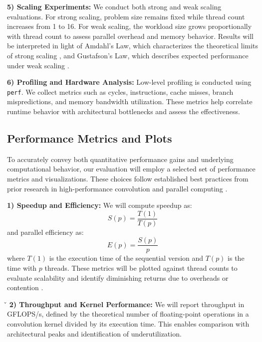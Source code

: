 \documentclass[conference, 10pt]{IEEEtran}
\begin{document}
\vspace{0.5em}
\textbf{5) Scaling Experiments:} 
We conduct both strong and weak scaling evaluations. For strong scaling, problem size remains fixed while thread count increases from 1 to 16. For weak scaling, the workload size grows proportionally with thread count to assess parallel overhead and memory behavior. Results will be interpreted in light of Amdahl’s Law, which characterizes the theoretical limits of strong scaling \cite{hager2021hpc}, and Gustafson’s Law, which describes expected performance under weak scaling \cite{Gustafson1988}.


\vspace{0.5em}
\textbf{6) Profiling and Hardware Analysis:} Low-level profiling is conducted using \texttt{perf}. We collect metrics such as cycles, instructions, cache misses, branch mispredictions, and memory bandwidth utilization. These metrics help correlate runtime behavior with architectural bottlenecks and assess the effectiveness.


\subsection{\textbf{Performance Metrics and Plots}}

To accurately convey both quantitative performance gains and underlying computational behavior, our evaluation will employ a selected set of performance metrics and visualizations. These choices follow established best practices from prior research in high-performance convolution and parallel computing \cite{Wang2023,  hager2021hpc, Rajput2013, Yoon2012}.

\vspace{0.5em}
\textbf{1) Speedup and Efficiency:} 
We will compute speedup as:
\begin{equation}
    S(p) = \frac{T(1)}{T(p)}
\end{equation}
and parallel efficiency as:
\begin{equation}
    E(p) = \frac{S(p)}{p}
\end{equation}
where \(T(1)\) is the execution time of the sequential version and \(T(p)\) is the time with \(p\) threads. These metrics will be plotted against thread counts to evaluate scalability and identify diminishing returns due to overheads or contention \cite{Rajput2013}.

\v\vspace{0.5em}
\textbf{2) Throughput and Kernel Performance:} 
We will report throughput in GFLOPS/s, defined by the theoretical number of floating-point operations in a convolution kernel divided by its execution time. This enables comparison with architectural peaks and identification of underutilization.
\end{document}
